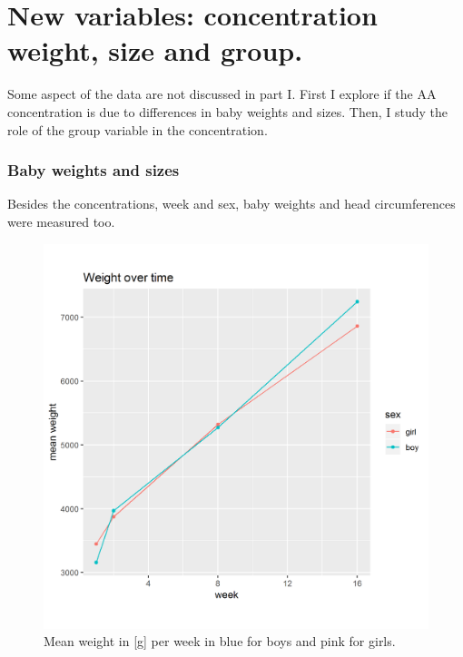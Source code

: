 \documentclass[12pt]{article}
\begin{document}
\clearpage

\part{New variables: concentration weight, size and group. }

Some aspect of the data are not discussed in part I. First I explore if the AA concentration is due to differences in baby weights and sizes. Then, I study the role of the group variable in the concentration.


\section{Baby weights and sizes}

Besides the concentrations, week and sex, baby weights and head circumferences were measured too.

\begin{figure}[!htb]
  \centering
  \includegraphics[width=\textwidth]{../wANDhc/weight.png}
  \caption{Mean weight in [g] per week in blue for boys and pink for girls.}
  \label{fig:weight}
\end{figure}
\end{document}
